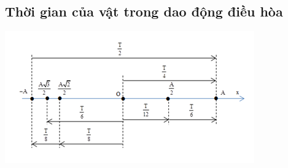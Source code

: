 \subsection{Thời gian của vật trong dao động điều hòa}
\begin{center}
	\includegraphics[scale=1.1]{../figs/VN12-PH-02-A-001-4-V2-2}
\end{center}
